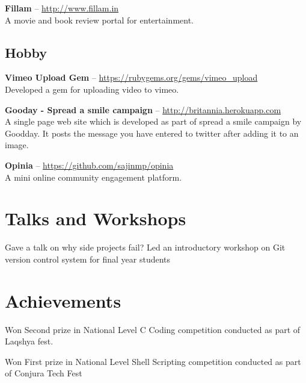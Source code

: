 \documentclass[11pt,a4paper]{moderncv}
\begin{document}
\cvlistitem
{\textbf{Fillam} -- {\small \href{http://www.fillam.in}{http://www.fillam.in}}
  \\A movie and book review portal for entertainment.
}


\subsection{Hobby}

\cvlistitem
{\textbf{Vimeo Upload Gem} -- {\small \href{https://rubygems.org/gems/vimeo\_upload}{https://rubygems.org/gems/vimeo\_upload}}
  \\Developed a gem for uploading video to vimeo.
}

\cvlistitem
{\textbf{Gooday - Spread a smile campaign} -- {\small \href{http://britannia.herokuapp.com}{http://britannia.herokuapp.com}}
  \\A single page web site which is developed as part of spread a smile campaign by\\
  Goodday. It posts the message you have entered to twitter after adding it to an\\
  image.
}

\cvlistitem
{\textbf{Opinia} -- {\small \href{https://github.com/sajinmp/opinia}{https://github.com/sajinmp/opinia}}
  \\A mini online community engagement platform.
}




\section{Talks and Workshops}
{Gave a talk on why side projects fail?}
{Led an introductory workshop on Git version control system for final year students} 


\section{Achievements}

{Won Second prize in National Level C Coding competition conducted as part of Laqshya fest.}

{Won First prize in National Level Shell Scripting competition conducted as part of Conjura Tech Fest}


\end{document}
